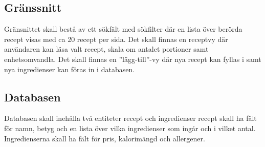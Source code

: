 \documentclass[10pt,a4paper]{report}
\begin{document}
\subsection{Gränssnitt}
Gränsnittet skall bestå av ett sökfält med sökfilter där en lista över berörda recept visas med ca 20 recept per sida. Det skall finnas en receptvy där användaren kan läsa valt recept, skala om antalet portioner samt enhetsomvandla. Det skall finnas en ”lägg-till”-vy där nya recept kan fyllas i samt nya ingredienser kan föras in i databasen.
\subsection{Databasen}
Databasen skall inehålla två entiteter recept och ingredienser recept skall ha fält för namn, betyg och en lista över vilka ingredienser som ingår och i vilket antal. Ingredienserna skall ha fält för pris, kalorimängd och allergener.
\end{document}
